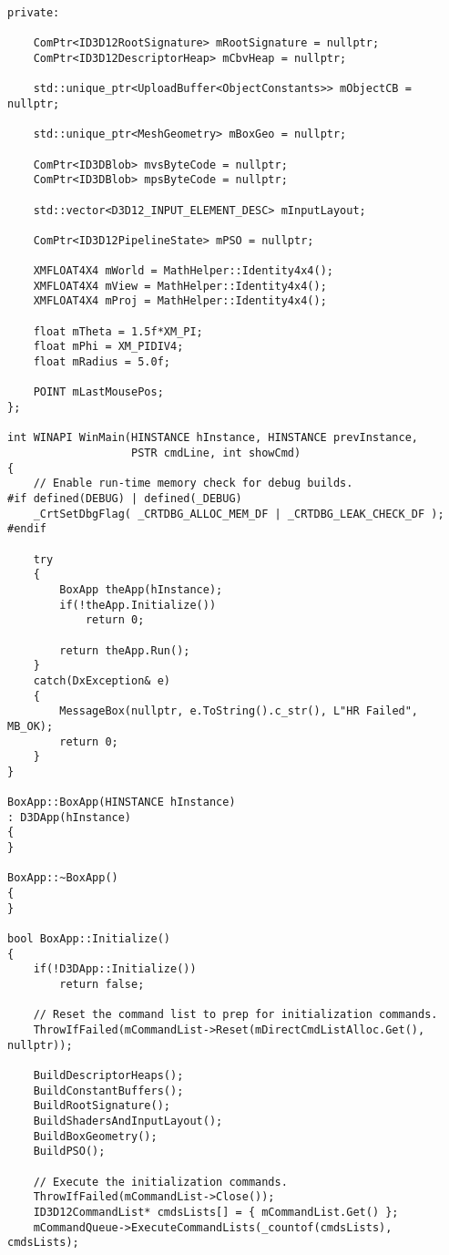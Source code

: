 \begin{lstlisting}
private:
    
    ComPtr<ID3D12RootSignature> mRootSignature = nullptr;
    ComPtr<ID3D12DescriptorHeap> mCbvHeap = nullptr;

    std::unique_ptr<UploadBuffer<ObjectConstants>> mObjectCB = nullptr;

    std::unique_ptr<MeshGeometry> mBoxGeo = nullptr;

    ComPtr<ID3DBlob> mvsByteCode = nullptr;
    ComPtr<ID3DBlob> mpsByteCode = nullptr;

    std::vector<D3D12_INPUT_ELEMENT_DESC> mInputLayout;

    ComPtr<ID3D12PipelineState> mPSO = nullptr;

    XMFLOAT4X4 mWorld = MathHelper::Identity4x4();
    XMFLOAT4X4 mView = MathHelper::Identity4x4();
    XMFLOAT4X4 mProj = MathHelper::Identity4x4();

    float mTheta = 1.5f*XM_PI;
    float mPhi = XM_PIDIV4;
    float mRadius = 5.0f;

    POINT mLastMousePos;
};

int WINAPI WinMain(HINSTANCE hInstance, HINSTANCE prevInstance,
                   PSTR cmdLine, int showCmd)
{
    // Enable run-time memory check for debug builds.
#if defined(DEBUG) | defined(_DEBUG)
    _CrtSetDbgFlag( _CRTDBG_ALLOC_MEM_DF | _CRTDBG_LEAK_CHECK_DF );
#endif

    try
    {
        BoxApp theApp(hInstance);
        if(!theApp.Initialize())
            return 0;

        return theApp.Run();
    }
    catch(DxException& e)
    {
        MessageBox(nullptr, e.ToString().c_str(), L"HR Failed", MB_OK);
        return 0;
    }
}

BoxApp::BoxApp(HINSTANCE hInstance)
: D3DApp(hInstance) 
{
}

BoxApp::~BoxApp()
{
}

bool BoxApp::Initialize()
{
    if(!D3DApp::Initialize())
        return false;
        
    // Reset the command list to prep for initialization commands.
    ThrowIfFailed(mCommandList->Reset(mDirectCmdListAlloc.Get(), nullptr));
 
    BuildDescriptorHeaps();
    BuildConstantBuffers();
    BuildRootSignature();
    BuildShadersAndInputLayout();
    BuildBoxGeometry();
    BuildPSO();

    // Execute the initialization commands.
    ThrowIfFailed(mCommandList->Close());
    ID3D12CommandList* cmdsLists[] = { mCommandList.Get() };
    mCommandQueue->ExecuteCommandLists(_countof(cmdsLists), cmdsLists);


\end{lstlisting}
